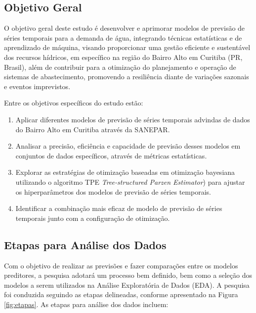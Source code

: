 \subsection{Objetivo Geral} \label{subsec:objetivos}

O objetivo geral deste estudo é desenvolver e aprimorar modelos de previsão de séries temporais para a demanda de água, integrando técnicas estatísticas e de aprendizado de máquina, visando proporcionar uma gestão eficiente e sustentável dos recursos hídricos, em específico na região do Bairro Alto em Curitiba (PR, Brasil), além de contribuir para a otimização do planejamento e operação de sistemas de abastecimento, promovendo a resiliência diante de variações sazonais e eventos imprevistos.

Entre os objetivos específicos do estudo estão:
\begin{enumerate}
	
\item Aplicar diferentes modelos de previsão de séries temporais advindas de dados do Bairro Alto em Curitiba através da SANEPAR.
	
 \item Analisar a precisão, eficiência e capacidade de previsão desses modelos em conjuntos de dados específicos, através de métricas estatísticas.
	
\item  Explorar as estratégias de otimização baseadas em otimização bayesiana utilizando o algoritmo TPE \textit{Tree-structured Parzen Estimator}) para ajustar os hiperparâmetros dos modelos de previsão de séries temporais.
	
\item Identificar a combinação mais eficaz de modelo de previsão de séries temporais junto com a configuração de otimização.
 
\end{enumerate}

\subsection{Etapas para An\'alise dos Dados} 
\label{subsec:metod}

Com o objetivo de realizar as previsões e fazer comparações entre os modelos preditores, a pesquisa adotará um processo bem definido, bem como a seleção dos modelos a serem utilizados na Análise Exploratória de Dados (EDA). A pesquisa foi conduzida seguindo as etapas delineadas, conforme apresentado na Figura \ref{fig:etapas}.
\noindent As etapas para análise dos dados incluem:

